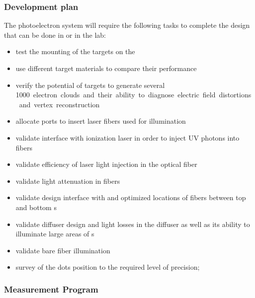 \subsubsection{Development plan}
The photoelectron system will require the following tasks to complete the design that can be done in  or in the lab: 
\begin{itemize}
    \item test the mounting of the targets on the 
    \item use different target materials to compare their performance
    \item verify the potential of targets to generate several \SI{1000} electron clouds and their %
    ability to diagnose electric field distortions and vertex reconstruction
    \item allocate ports to insert laser fibers used for illumination
    \item validate interface with %
    ionization laser in order to inject UV photons into fibers
    \item validate efficiency of laser light injection in the optical fiber
    \item validate light attenuation in fibers
    \item validate design interface with  and optimized locations of fibers between top and bottom s  
    \item validate diffuser design and light losses in the diffuser as well as its ability to illuminate large areas of s
    \item validate bare fiber  illumination
    \item survey of the dots position to the required level of precision; %

\end{itemize}

\subsubsection{Measurement Program}
\label{sec:sp-calib-sys-las-pe-meas} 

